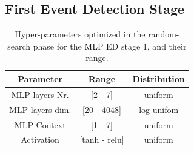 \subsection{First Event Detection Stage}
\label{sec:results}


\begin{table}[b]
	\caption{Hyper-parameters optimized in the random-search phase for the MLP ED stage 1, and their range.}\label{tbl:hyper-params-mlp}
	\centering
	\footnotesize
	\begin{tabular} {|c | c | c|}
		\hline
		Parameter & Range & Distribution\\  
		\hline
		\hline                                     
		MLP layers Nr.  & [2 - 7]& uniform \\
		\hline                                     
		MLP layers dim. & [20 - 4048]& log-unifom \\
		\hline                                     
		MLP Context & [1 - 7] & uniform\\
		\hline
		Activation & [tanh - relu] & uniform\\
		\hline
	\end{tabular}
\end{table}

